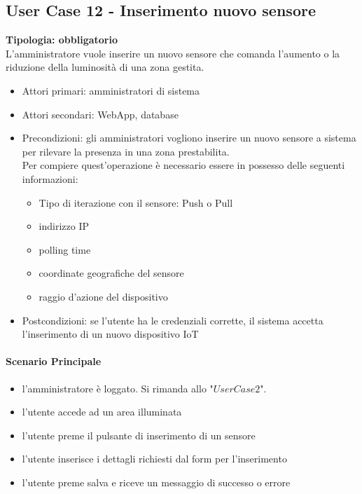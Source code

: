\documentclass[12pt]{article}
\begin{document}
\subsection{User Case 12 - Inserimento nuovo sensore}
\textbf{Tipologia: obbligatorio}\\
L'amministratore vuole inserire un nuovo sensore che comanda l'aumento o la riduzione della luminosità di una zona gestita.
\begin{itemize}
	\item Attori primari: amministratori di sistema
	\item Attori secondari: WebApp, database
	\item Precondizioni: gli amministratori vogliono inserire un nuovo sensore a sistema per rilevare la presenza in una zona prestabilita.\\
	 Per compiere quest'operazione è necessario essere in possesso delle seguenti informazioni: 
	\begin{itemize}
		\item Tipo di iterazione con il sensore: Push o Pull
		\item indirizzo IP
		\item polling time
		\item coordinate geografiche del sensore
		\item raggio d'azione del dispositivo
	\end{itemize}
	\item Postcondizioni: se l'utente ha le credenziali corrette, il sistema accetta l'inserimento di un nuovo dispositivo IoT
\end{itemize}
\paragraph{Scenario Principale}
\begin{itemize}
	\item l'amministratore è loggato. Si rimanda allo "$User Case 2$".
	\item l'utente accede ad un area illuminata
	\item l'utente preme il pulsante di inserimento di un sensore
	\item l'utente inserisce i dettagli richiesti dal form per l'inserimento
	\item l'utente preme salva e riceve un messaggio di successo o errore
\end{itemize}
\end{document}
